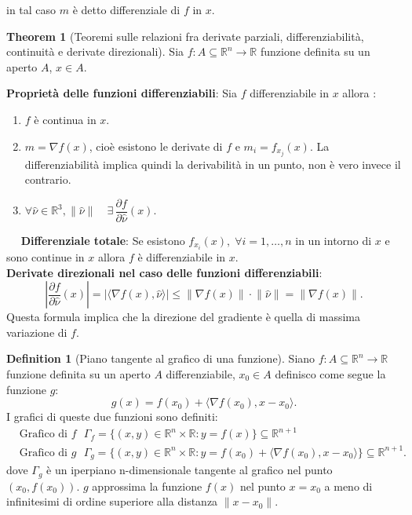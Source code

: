 \documentclass[leqno]{article}
\theoremstyle{definition}
\newtheorem{definition}{Definition}[section]
\numberwithin{equation}{section}
\newtheorem{theorem}{Theorem}[section]
\theoremstyle{remark}
\begin{document}
	in tal caso $m$ è detto differenziale di $f$ in $x$.
	
	\begin{theorem}[Teoremi sulle relazioni fra derivate parziali, differenziabilità, continuità e derivate direzionali]
		Sia $f:A\subseteq \mathbb{R}^n \rightarrow \mathbb{R}$ funzione definita su un aperto $A$, $ {x} \in A$.
		\newline
		
		\textbf{Proprietà delle funzioni differenziabili}:
		Sia $f$ differenziabile in $x$ allora :
		\begin{enumerate}
			\item $f$ è continua in $x$.
			\item $m=\nabla f (x)$, cioè esistono le derivate di $f$ e $m_i=f_{x_j}(x).$ La differenziabilità implica quindi la derivabilità in un punto, non è vero invece il contrario.
			\item $\forall \hat{\nu} \in \mathbb{R}^3, \lVert \hat{\nu} \rVert \quad \exists \, \dfrac{\partial f }{\partial \hat{\nu}}(x)$.
		\end{enumerate} 
		$\quad$ \textbf{Differenziale totale}: Se esistono $f_{x_i}(x), \; \forall i = 1, \dots ,n$ in un intorno di $x$ e sono continue in $x$ allora $f$ è differenziabile in $x$.
		\\
		\textbf{Derivate direzionali nel caso delle funzioni differenziabili}: 
		\begin{equation}
			\left| \dfrac{\partial f}{\partial \hat{\nu}}(x) \right|=\left| \langle \nabla f(x), \hat{\nu}\rangle \right| \le \lVert \nabla f(x)\rVert \cdot \lVert \hat{\nu} \rVert = \lVert \nabla f(x) \rVert.
		\end{equation}
		Questa formula implica che la direzione del gradiente è quella di massima variazione di $f$.
	\end{theorem}
	
	\begin{definition}[Piano tangente al grafico di una funzione]
		Siano $f:A\subseteq \mathbb{R}^n \rightarrow \mathbb{R}$ funzione definita su un aperto $A$ differenziabile, $ {x_0} \in A$ definisco come segue la funzione $g$:
		\begin{equation}
			g(x) = f(x_0)+\langle \nabla f (x_0) , x-x_0\rangle .
		\end{equation}
		I grafici di queste due funzioni sono definiti:
		\begin{equation}
			\begin{aligned}
				&\text{Grafico di $f$ } \Gamma_f =\{ (x,y)\in \mathbb{R}^n \times \mathbb{R} : y = f(x) \} \subseteq \mathbb{R}^{n+1} \\
				&\text {Grafico di $g$ } \Gamma_g = \{ (x,y)\in \mathbb{R}^n \times \mathbb{R} : y = f(x_0) + \langle \nabla f(x_0) , x - x_0 \rangle \} \subseteq \mathbb{R}^{n+1}.
			\end{aligned}
		\end{equation}
		dove $\Gamma_g$ è un iperpiano n-dimensionale tangente al grafico nel punto $(x_0,f(x_0))$. $g$ approssima la funzione $f(x)$ nel punto $x=x_0$ a meno di infinitesimi di ordine superiore alla distanza $\lVert x-x_0 \rVert$.
	\end{definition}
	
\end{document}
